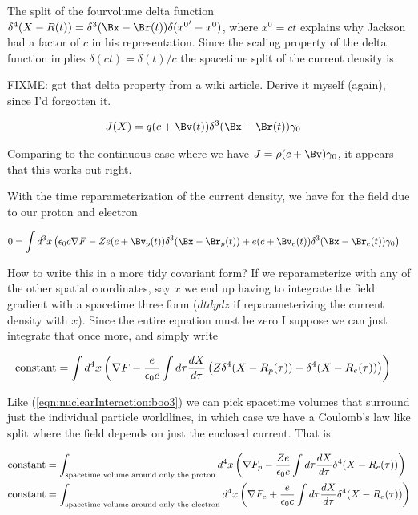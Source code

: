 The split of the fourvolume delta function $\delta^4(X - R(t)) = \delta^3(\Bx - \Br(t)) \delta( {x^0}' - x^0 )$, where $x^0 = c t$ explains why Jackson had a factor of $c$ in his representation.  Since the scaling property of the delta function implies $\delta(c t) = \delta(t)/c$ the spacetime split of the current density is

FIXME: got that delta property from a wiki article.  Derive it myself (again), since I'd forgotten it.

\begin{align}\label{eqn:nuclearInteraction:boo11}
J(X) 
&= q (c + \Bv(t))\delta^3 (\Bx - \Br(t)) \gamma_0 
\end{align}

Comparing to the continuous case where we have $J = \rho ( c + \Bv ) \gamma_0$, it appears that this works out right.

With the time reparameterization of the current density, we have for the field due to our proton and electron

\begin{align}\label{eqn:nuclearInteraction:boo8}
0 &= \int d^3 x \left( \epsilon_0 c \grad F - Z e (c + \Bv_p(t))\delta^3 (\Bx - \Br_p(t)) + e (c + \Bv_e(t))\delta^3 (\Bx - \Br_e(t)) 
\gamma_0 \right)
\end{align}

How to write this in a more tidy covariant form?  If we reparameterize with any of the other spatial coordinates, say $x$ we end up having to integrate the field gradient with a spacetime three form ($dt dy dz$ if reparameterizing the current density with $x$).  Since the entire equation must be zero I suppose we can just integrate that once more, and simply write

\begin{align}\label{eqn:nuclearInteraction:boo9}
\text{constant} &= \int d^4 x \left( \nabla F - \frac{e}{\epsilon_0 c}\int d\tau \frac{dX}{d\tau} \left( Z \delta^4 (X - R_p(\tau)) - \delta^4 (X - R_e(\tau)) \right) \right)
\end{align}

Like (\ref{eqn:nuclearInteraction:boo3}) we can pick spacetime volumes that surround just the individual particle worldlines, in which case we have a Coulomb's law like split where the field depends on just the enclosed current.  That is

\begin{align}\label{eqn:nuclearInteraction:boo10}
\text{constant} &= \int_{\text{spacetime volume around only the proton}} d^4 x \left( \nabla F_p - \frac{Z e}{\epsilon_0 c} \int d\tau \frac{dX}{d\tau} \delta^4 (X - R_e(\tau)) \right) \\
\text{constant} &= \int_{\text{spacetime volume around only the electron}} d^4 x \left( \nabla F_e + \frac{e}{\epsilon_0 c} \int d\tau \frac{dX}{d\tau} \delta^4 (X - R_e(\tau)) \right)
\end{align}

